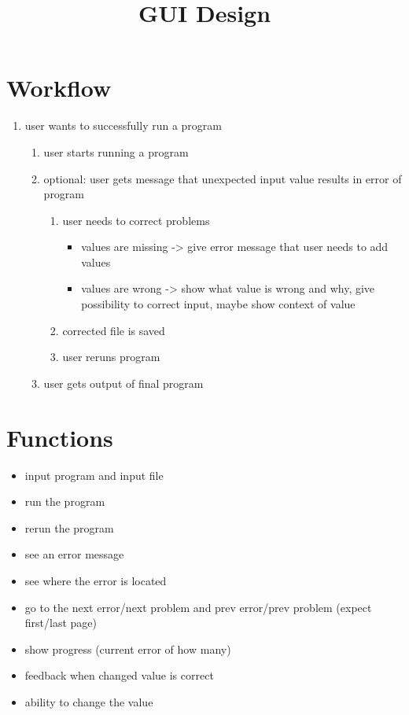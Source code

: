 \documentclass[11pt]{article}
\begin{document}
\title{GUI Design}


\section{Workflow}

\begin{enumerate}
  \item user wants to successfully run a program
  \begin{enumerate}
    \item user starts running a program
    \item optional: user gets message that unexpected input value results in error of program
    \begin{enumerate}
      \item user needs to correct problems
      \begin{itemize}
	\item values are missing -> give error message that user needs to add values
	\item values are wrong -> show what value is wrong and why, give possibility to correct input, maybe show context of value
      \end{itemize}
      \item corrected file is saved
      \item user reruns program
    \end{enumerate}
    \item user gets output of final program
  \end{enumerate}
\end{enumerate}

\section{Functions}

\begin{itemize}
  \item input program and input file
  \item run the program
  \item rerun the program
  \item see an error message
  \item see where the error is located
  \item go to the next error/next problem and prev error/prev problem (expect first/last page)
  \item show progress (current error of how many)
  \item feedback when changed value is correct
  \item ability to change the value
\end{itemize}
\end{document}

